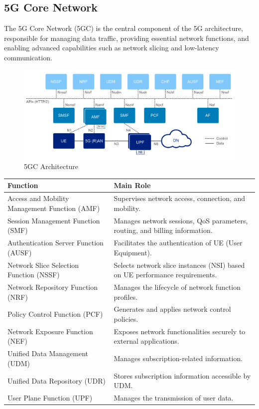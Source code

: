 \documentclass{report}
\begin{document}
\subsection{5G Core Network}
The 5G Core Network (5GC) is the central component of the 5G architecture, responsible for managing data traffic, providing essential network functions, and enabling advanced capabilities such as network slicing and low-latency communication.
\begin{figure}[H]
    \centering
    \includegraphics[width=0.8\linewidth]{figures/5GC.png}
    \caption{5GC Architecture \cite{dolente2023vulnerability}}
    \label{fig:5GCarch}
\end{figure}

\begin{table}[H]
    \centering
    \begin{tabularx}{\textwidth}{lX}
        \toprule
        \textbf{Function} & \textbf{Main Role} \\
        \midrule
        Access and Mobility Management Function (AMF) & Supervises network access, connection, and mobility. \\
        \addlinespace
        Session Management Function (SMF) & Manages network sessions, QoS parameters, routing, and billing information. \\
        \addlinespace
        Authentication Server Function (AUSF) & Facilitates the authentication of UE (User Equipment). \\
        \addlinespace
        Network Slice Selection Function (NSSF) & Selects network slice instances (NSI) based on UE performance requirements. \\
        \addlinespace
        Network Repository Function (NRF) & Manages the lifecycle of network function profiles. \\
        \addlinespace
        Policy Control Function (PCF) & Generates and applies network control policies. \\
        \addlinespace
        Network Exposure Function (NEF) & Exposes network functionalities securely to external applications. \\
        \addlinespace
        Unified Data Management (UDM) & Manages subscription-related information. \\
        \addlinespace
        Unified Data Repository (UDR) & Stores subscription information accessible by UDM. \\
        \addlinespace
        User Plane Function (UPF) & Manages the transmission of user data. \\
        \bottomrule
    \end{tabularx}
\end{table}
\end{document}
